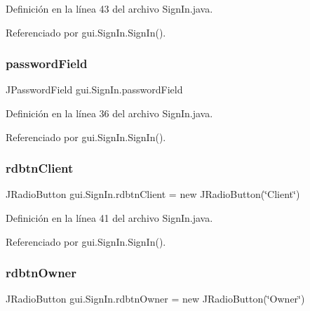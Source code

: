 Definición en la línea 43 del archivo Sign\+In.\+java.



Referenciado por gui.\+Sign\+In.\+Sign\+In().

\mbox{\label{classgui_1_1_sign_in_a3334294c202619a0e673c162f0d5b280}} 
\subsubsection{\texorpdfstring{passwordField}{passwordField}}
{\footnotesize\ttfamily J\+Password\+Field gui.\+Sign\+In.\+password\+Field\hspace{0.3cm}{\ttfamily [private]}}



Definición en la línea 36 del archivo Sign\+In.\+java.



Referenciado por gui.\+Sign\+In.\+Sign\+In().

\mbox{\label{classgui_1_1_sign_in_acf11e0c6e73a74d0b4bcd5cc84a64f2a}} 
\subsubsection{\texorpdfstring{rdbtnClient}{rdbtnClient}}
{\footnotesize\ttfamily J\+Radio\+Button gui.\+Sign\+In.\+rdbtn\+Client = new J\+Radio\+Button(\char`\"{}Client\char`\"{})\hspace{0.3cm}{\ttfamily [private]}}



Definición en la línea 41 del archivo Sign\+In.\+java.



Referenciado por gui.\+Sign\+In.\+Sign\+In().

\mbox{\label{classgui_1_1_sign_in_a4b8b426bb66155e4c5ff3fc71d6fab73}} 
\subsubsection{\texorpdfstring{rdbtnOwner}{rdbtnOwner}}
{\footnotesize\ttfamily J\+Radio\+Button gui.\+Sign\+In.\+rdbtn\+Owner = new J\+Radio\+Button(\char`\"{}Owner\char`\"{})\hspace{0.3cm}{\ttfamily [private]}}



